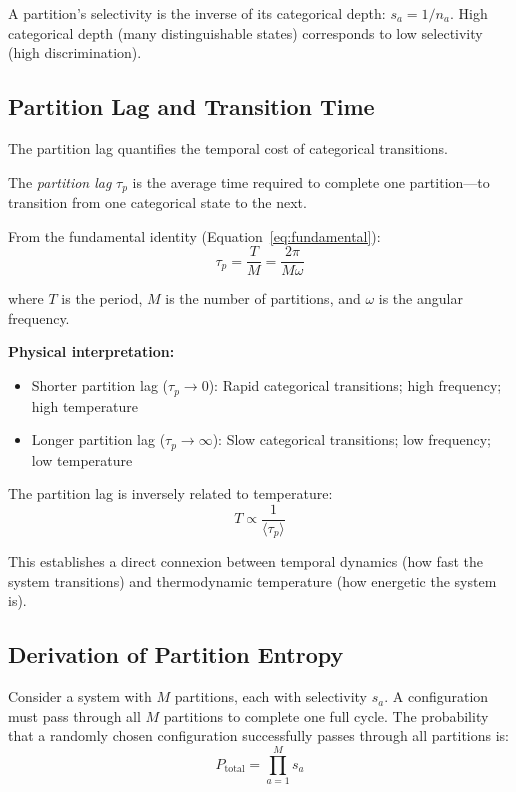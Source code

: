 A partition's selectivity is the inverse of its categorical depth: $s_a = 1/n_a$. High categorical depth (many distinguishable states) corresponds to low selectivity (high discrimination).



\subsection{Partition Lag and Transition Time}

The partition lag quantifies the temporal cost of categorical transitions.

\begin{definition}
The \textit{partition lag} $\tau_p$ is the average time required to complete one partition—to transition from one categorical state to the next.
\end{definition}

From the fundamental identity (Equation~\ref{eq:fundamental}):
\begin{equation}
\tau_p = \frac{T}{M} = \frac{2\pi}{M\omega}
\end{equation}

where $T$ is the period, $M$ is the number of partitions, and $\omega$ is the angular frequency.

\textbf{Physical interpretation:}
\begin{itemize}
\item Shorter partition lag ($\tau_p \to 0$): Rapid categorical transitions; high frequency; high temperature
\item Longer partition lag ($\tau_p \to \infty$): Slow categorical transitions; low frequency; low temperature
\end{itemize}

The partition lag is inversely related to temperature:
\begin{equation}
T \propto \frac{1}{\langle\tau_p\rangle}
\end{equation}

This establishes a direct connexion between temporal dynamics (how fast the system transitions) and thermodynamic temperature (how energetic the system is).

\subsection{Derivation of Partition Entropy}

Consider a system with $M$ partitions, each with selectivity $s_a$. A configuration must pass through all $M$ partitions to complete one full cycle. The probability that a randomly chosen configuration successfully passes through all partitions is:
\begin{equation}
P_{\text{total}} = \prod_{a=1}^{M} s_a
\end{equation}

